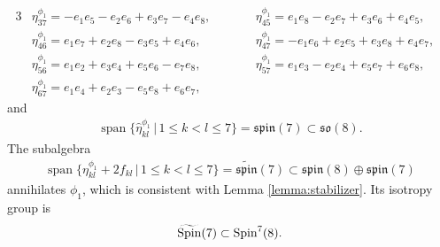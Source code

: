 \documentclass[10pt,a4paper]{amsart}
\numberwithin{equation}{section}
\begin{document}
{\begin{alignat*}{3}
& \eta^{\phi_1}_{3 7} = -e_{1} e_{5} - e_{2} e_{6} + e_{3} e_{7} - e_{4} e_{8},\qquad &&
 \eta^{\phi_1}_{4 5} = e_{1} e_{8} - e_{2} e_{7} + e_{3} e_{6} + e_{4} e_{5},&\\
& \eta^{\phi_1}_{4 6} = e_{1} e_{7} + e_{2} e_{8} - e_{3} e_{5} + e_{4} e_{6},\qquad &&
 \eta^{\phi_1}_{4 7} = -e_{1} e_{6} + e_{2} e_{5} + e_{3} e_{8} + e_{4} e_{7},&\\
& \eta^{\phi_1}_{5 6} = e_{1} e_{2} + e_{3} e_{4} + e_{5} e_{6} - e_{7} e_{8},\qquad &&
 \eta^{\phi_1}_{5 7} = e_{1} e_{3} - e_{2} e_{4} + e_{5} e_{7} + e_{6} e_{8},&\\
& \eta^{\phi_1}_{6 7} = e_{1} e_{4} + e_{2} e_{3} - e_{5} e_{8} + e_{6} e_{7},\qquad &&&
\end{alignat*}
and
\begin{gather*}\operatorname{span}\big\{\hat\eta_{kl}^{\phi_1} \,|\, 1\leq k<l\leq 7 \big\} = \mathfrak{spin}(7) \subset \mathfrak{so}(8).\end{gather*}
The subalgebra
\begin{gather*}\operatorname{span}\big\{\eta_{kl}^{\phi_1} + 2 f_{kl}\,|\, 1\leq k<l\leq 7 \big\} = \widetilde{\mathfrak{spin}}(7) \subset
\mathfrak{spin}(8)\oplus \mathfrak{spin}(7)\end{gather*}
annihilates ${\phi_1}$, which is consistent with Lemma \ref{lemma:stabilizer}. Its isotropy group is
\begin{gather*}\widetilde{\rm Spin}(7)\subset {\rm Spin}^7(8).\end{gather*}

}
\end{document}
